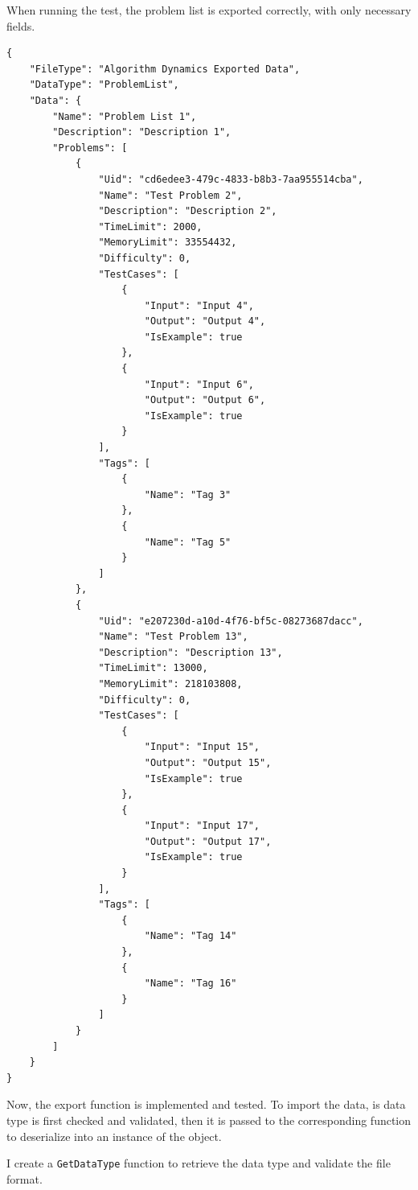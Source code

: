 \documentclass[a4paper]{report}
\newcommand{\code}{\texttt}
\begin{document}
When running the test, the problem list is exported correctly, with only necessary fields.

\begin{verbatim}
{
    "FileType": "Algorithm Dynamics Exported Data",
    "DataType": "ProblemList",
    "Data": {
        "Name": "Problem List 1",
        "Description": "Description 1",
        "Problems": [
            {
                "Uid": "cd6edee3-479c-4833-b8b3-7aa955514cba",
                "Name": "Test Problem 2",
                "Description": "Description 2",
                "TimeLimit": 2000,
                "MemoryLimit": 33554432,
                "Difficulty": 0,
                "TestCases": [
                    {
                        "Input": "Input 4",
                        "Output": "Output 4",
                        "IsExample": true
                    },
                    {
                        "Input": "Input 6",
                        "Output": "Output 6",
                        "IsExample": true
                    }
                ],
                "Tags": [
                    {
                        "Name": "Tag 3"
                    },
                    {
                        "Name": "Tag 5"
                    }
                ]
            },
            {
                "Uid": "e207230d-a10d-4f76-bf5c-08273687dacc",
                "Name": "Test Problem 13",
                "Description": "Description 13",
                "TimeLimit": 13000,
                "MemoryLimit": 218103808,
                "Difficulty": 0,
                "TestCases": [
                    {
                        "Input": "Input 15",
                        "Output": "Output 15",
                        "IsExample": true
                    },
                    {
                        "Input": "Input 17",
                        "Output": "Output 17",
                        "IsExample": true
                    }
                ],
                "Tags": [
                    {
                        "Name": "Tag 14"
                    },
                    {
                        "Name": "Tag 16"
                    }
                ]
            }
        ]
    }
}
\end{verbatim}

Now, the export function is implemented and tested. To import the data, is data type is first checked and validated, then it is passed to the corresponding function to deserialize into an instance of the object.

I create a \code{GetDataType} function to retrieve the data type and validate the file format.
\end{document}
